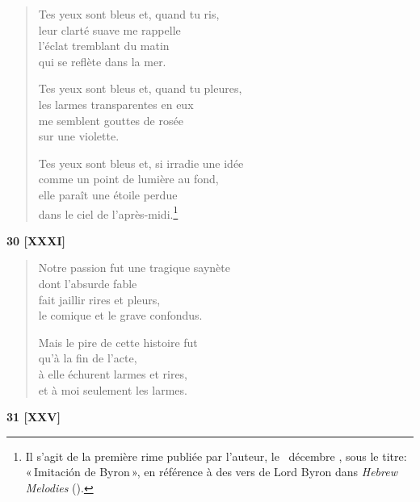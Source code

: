 \begin{verse}
  Tes yeux sont bleus et, quand tu ris, \\
  leur clarté suave me rappelle \\
  l'éclat tremblant du matin \\
  qui se reflète dans la mer.

  Tes yeux sont bleus et, quand tu pleures, \\
  les larmes transparentes en eux \\
  me semblent gouttes de rosée \\
  sur une violette.

  Tes yeux sont bleus et, si irradie une idée \\
  comme un point de lumière au fond, \\
  elle paraît une étoile perdue \\
  dans le ciel de l'après-midi.\footnote{Il s'agit de la première rime
  publiée par l'auteur, le ~décembre
  , sous le titre: «\,Imitación de Byron\,», en
  référence à des vers de Lord Byron dans \emph{Hebrew Melodies}
  ().}
\end{verse}

\bigskip

\begin{center}
  \textbf{30 [XXXI]}
\end{center}

\begin{verse}
  Notre passion fut une tragique saynète \\
  dont l'absurde fable \\
  fait jaillir rires et pleurs, \\
  le comique et le grave confondus.

  Mais le pire de cette histoire fut \\
  qu'à la fin de l'acte, \\
  à elle échurent larmes et rires, \\
  et à moi seulement les larmes.
\end{verse}

\pagebreak

\begin{center}
  \textbf{31 [XXV]}
\end{center}

